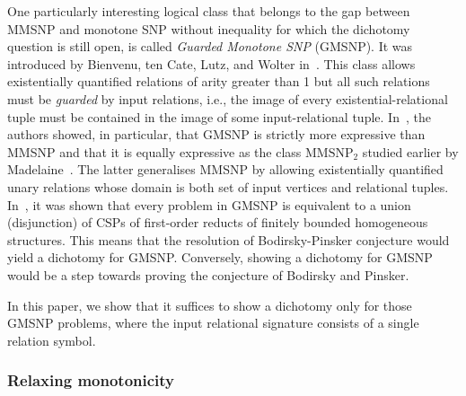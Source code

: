 \documentclass[10pt,a4paper]{amsart}
\theoremstyle{plain}
\theoremstyle{definition}
\numberwithin{equation}{section}
\newcommand{\MMSNPtwo}[0]{\ensuremath{\textrm{MMSNP}_2}}
\begin{document}
One particularly interesting logical class that belongs to the gap between MMSNP and monotone SNP without inequality for which the dichotomy question is still open, is called \emph{Guarded Monotone SNP} (GMSNP).
%
It was introduced by Bienvenu, ten Cate, Lutz, and Wolter in~\cite{bienvenu2014}.
%
This class allows existentially quantified relations of arity greater than 1 but all such relations must be \emph{guarded} by input relations, i.e., the image of every existential-relational tuple must be contained in the image of some input-relational tuple.
%
In~\cite{bienvenu2014}, the authors showed, in particular, that GMSNP is strictly more expressive than MMSNP and that it is equally expressive as the class $\MMSNPtwo$ studied earlier by Madelaine~\cite{madelaine2009}.
%
The latter generalises MMSNP by allowing existentially quantified unary relations whose domain is both set of input vertices and relational tuples.
%
In~\cite{bodirsky_asnp}, it was shown that every problem in GMSNP is equivalent to a union (disjunction) of CSPs of first-order reducts of finitely bounded homogeneous structures.
%
This means that the resolution of Bodirsky-Pinsker conjecture would yield a dichotomy for GMSNP.
%
Conversely, showing a dichotomy for GMSNP would be a step towards proving the conjecture of Bodirsky and Pinsker.

In this paper, we show that it suffices to show a dichotomy only for those GMSNP problems, where the input relational signature consists of a single relation symbol.



\subsubsection*{Relaxing monotonicity}
\end{document}
